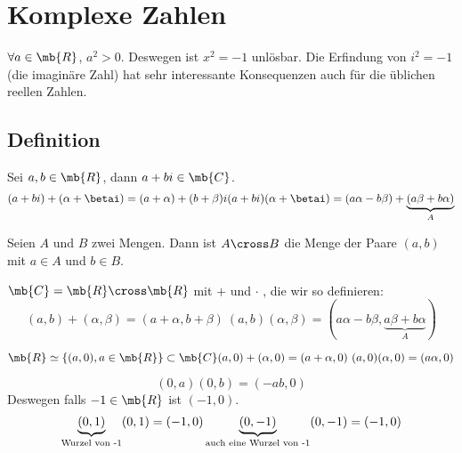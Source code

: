 \section{Komplexe Zahlen}
\begin{Bem}
  $\forall a\in \mb{R}$, $a^2>0$. Deswegen ist $x^2=-1$ unlösbar.
  Die Erfindung von $i^2=-1$ (die imaginäre Zahl) hat sehr interessante Konsequenzen auch für die üblichen reellen Zahlen.
\end{Bem}
\subsection{Definition}
\begin{Def}
  Sei $a,b\in\mb{R}$, dann $a+bi\in\mb{C}$.
  \begin{equation*}
    (a+bi)+(\alpha+\betai) = (a+\alpha)+(b+\beta)i\\
    (a+bi)(\alpha+\betai) = (a\alpha-b\beta)+\underbrace{(a\beta+b\alpha)}_{A}
  \end{equation*}
\end{Def}
\begin{Def}
  Seien $A$ und $B$ zwei Mengen. Dann ist $A\cross B$ die Menge der Paare $(a,b)$ mit $a\in A$ und $b\in B$.
\end{Def}
\begin{Def}
  $\mb{C}=\mb{R}\cross\mb{R}$ mit $+$ und $\cdot$ , die wir so definieren:
  \begin{equation*}
    (a,b)+(\alpha,\beta)=(a+\alpha,b+\beta)\
    (a,b)(\alpha,\beta)=(a\alpha-b\beta, \underbrace{a\beta+b\alpha}_{A})
  \end{equation*}
\end{Def}
\begin{Bem}
  \begin{equation*}
    \mb{R}\simeq \left\{ (a,0), a\in\mb{R} \right\}\subset\mb{C}\\
    (a,0)+(\alpha,0)=(a+\alpha,0)\
    (a,0)(\alpha,0)=(a\alpha,0)
  \end{equation*}
\end{Bem}
\begin{Bem}
  \begin{equation*}
    (0,a)(0,b)=(-ab, 0)
  \end{equation*}
  Deswegen falls $-1\in\mb{R}$ ist $(-1,0)$.
  \begin{equation*}
    \underbrace{(0,1)}_{\text{Wurzel von -1}}(0,1)=(-1,0)\\
    \underbrace{(0,-1)}_{\text{auch eine Wurzel von -1}}(0,-1)=(-1,0)
  \end{equation*}
\end{Bem}
